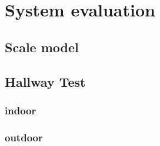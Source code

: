 \chapter{System evaluation}
\label{System_evaluation}

\section{Scale model}


\section{Hallway Test}

\subsection{indoor}

\subsection{outdoor}